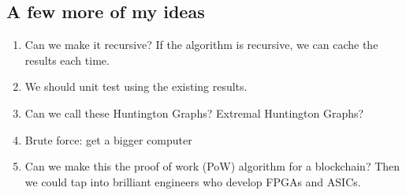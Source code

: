 \documentclass{article}
\begin{document}
\subsection{A few more of my ideas}
\begin{enumerate}
	\item Can we make it recursive? If the algorithm is recursive, we can cache the results each time.
	\item We should unit test using the existing results.
	\item Can we call these Huntington Graphs? Extremal Huntington Graphs?
	\item Brute force: get a bigger computer
	\item Can we make this the proof of work (PoW) algorithm for a blockchain? Then we could tap into brilliant engineers who develop FPGAs and ASICs.
\end{enumerate}
\end{document}
